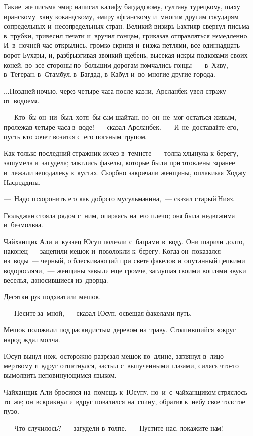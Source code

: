 \documentclass[12pt,a4paper]{book}
\begin{document}
Такие~же письма эмир написал калифу багдадскому, султану турецкому, шаху иранскому, хану кокандскому, эмиру афганскому и~многим другим государям сопредельных и~несопредельных стран. Великий визирь Бахтияр свернул письма в~трубки, привесил печати и~вручил гонцам, приказав отправляться немедленно. И~в~ночной час открылись, громко скрипя и~визжа петлями, все одиннадцать ворот Бухары, и, разбрызгивая звонкий щебень, высекая искры подковами своих коней, во~все стороны по~большим дорогам помчались гонцы~— в~Хиву, в~Тегеран, в~Стамбул, в~Багдад, в~Кабул и~во~многие другие города.

...Поздней ночью, через четыре часа после казни, Арсланбек увел стражу от~водоема.

—~Кто~бы он~ни~был, хотя~бы сам шайтан, но~он~не~мог остаться живым, пролежав четыре часа в~воде! —~сказал Арсланбек. —~И~не~доставайте его, пусть кто хочет возится с~его поганым трупом.

Как только последний стражник исчез в~темноте~— толпа хлынула к~берегу, зашумела и~загудела; зажглись факелы, которые были приготовлены заранее и~лежали неподалеку в~кустах. Скорбно закричали женщины, оплакивая Ходжу Насреддина.

—~Надо похоронить его как доброго мусульманина,~— сказал старый Нияз.

Гюльджан стояла рядом с~ним, опираясь на~его плечо; она была недвижима и~безмолвна.

Чайханщик Али и~кузнец Юсуп полезли с~баграми в~воду. Они шарили долго, наконец~— зацепили мешок и~поволокли к~берегу. Когда он~показался из~воды~— черный, отблескивающий при свете факелов и~опутанный цепкими водорослями,~— женщины завыли еще громче, заглушая своими воплями звуки веселья, доносившиеся из~дворца.

Десятки рук подхватили мешок.

—~Несите за~мной,~— сказал Юсуп, освещая факелами путь.

Мешок положили под раскидистым деревом на~траву. Столпившийся вокруг народ ждал молча.

Юсуп вынул нож, осторожно разрезал мешок по~длине, заглянул в~лицо мертвому и~вдруг отшатнулся, застыл с~выпученными глазами, силясь что-то вымолвить неповинующимся языком.

Чайханщик Али бросился на~помощь к~Юсупу, но~и~с~чайханщиком стряслось то~же; он~вскрикнул и~вдруг повалился на~спину, обратив к~небу свое толстое пузо.

—~Что случилось? —~загудели в~толпе. —~Пустите нас, покажите нам!
\end{document}
